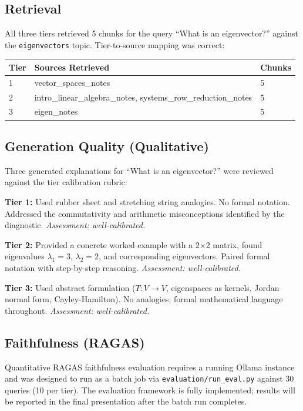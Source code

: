\documentclass[11pt]{article}
\begin{document}
\subsection{Retrieval}

All three tiers retrieved 5 chunks for the query ``What is an eigenvector?'' against the \texttt{eigenvectors} topic. Tier-to-source mapping was correct:

\begin{tabular}{lll}
\toprule
Tier & Sources Retrieved & Chunks \\
\midrule
1 & vector\_spaces\_notes & 5 \\
2 & intro\_linear\_algebra\_notes, systems\_row\_reduction\_notes & 5 \\
3 & eigen\_notes & 5 \\
\bottomrule
\end{tabular}

\subsection{Generation Quality (Qualitative)}

Three generated explanations for ``What is an eigenvector?'' were reviewed against the tier calibration rubric:

\medskip
\textbf{Tier 1:} Used rubber sheet and stretching string analogies. No formal notation. Addressed the commutativity and arithmetic misconceptions identified by the diagnostic. \textit{Assessment: well-calibrated.}

\medskip
\textbf{Tier 2:} Provided a concrete worked example with a 2$\times$2 matrix, found eigenvalues $\lambda_1 = 3$, $\lambda_2 = 2$, and corresponding eigenvectors. Paired formal notation with step-by-step reasoning. \textit{Assessment: well-calibrated.}

\medskip
\textbf{Tier 3:} Used abstract formulation ($T: V \to V$, eigenspaces as kernels, Jordan normal form, Cayley-Hamilton). No analogies; formal mathematical language throughout. \textit{Assessment: well-calibrated.}

\subsection{Faithfulness (RAGAS)}

Quantitative RAGAS faithfulness evaluation requires a running Ollama instance and was designed to run as a batch job via \texttt{evaluation/run\_eval.py} against 30 queries (10 per tier). The evaluation framework is fully implemented; results will be reported in the final presentation after the batch run completes.
\end{document}

